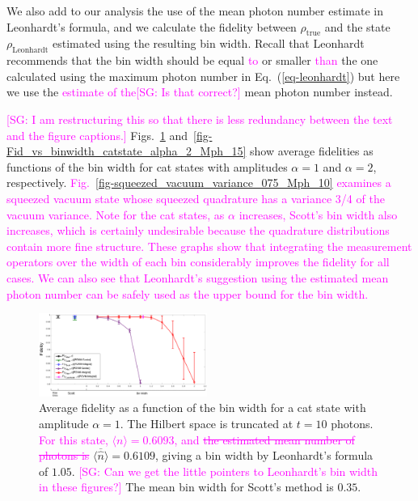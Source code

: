 \documentclass[
reprint,
superscriptaddress,
showpacs,
amsmath,
amssymb,
aps,
pra,
longbibliography
]{revtex4-1}
\providecommand{\aucmnt}[1]{#1}
\providecommand{\editcolor}[2]{\textcolor{#1}{#2}}
\providecommand{\aucmnt}[1]{}
\providecommand{\editcolor}[2]{#2}
\newcommand{\SG}[1]{\editcolor{magenta}{#1}}
\newcommand{\SGs}[1]{\aucmnt{\editcolor{magenta}{\sout{#1}}}}
\newcommand{\SGc}[1]{\aucmnt{\editcolor{magenta}{[SG: #1]}}}
\newcommand{\rhotrue}{\rho_{\text{true}}}
\begin{document}
We also add to our analysis the use of the mean photon number estimate
in Leonhardt's formula, and we calculate the fidelity between
$\rhotrue$ and the state $\rho_{\mathrm{Leonhardt}}$ estimated using
the resulting bin width. Recall that Leonhardt recommends that the bin
width should be equal \SG{to} or smaller \SG{than} the one calculated
using the maximum photon number in Eq.~(\ref{eq-leonhardt}) but here
we use the \SG{estimate of the}\SGc{Is that correct?} mean photon
number instead.

\SGc{I am restructuring this so that there is less redundancy between
  the text and the figure captions.}
Figs.~\ref{fig-Fidelity_vs_binwidth_catstate_Mph_10_alpha_1}
and~\ref{fig-Fid_vs_binwidth_catstate_alpha_2_Mph_15} show average
fidelities as functions of the bin width for cat states with
amplitudes $\alpha=1$ and $\alpha=2$,
respectively. \SG{Fig.~\ref{fig-squeezed_vacuum_variance_075_Mph_10}
  examines a squeezed vacuum state whose squeezed quadrature has a
  variance 3/4 of the vacuum variance.  Note for the cat states, as
  $\alpha$ increases, Scott's bin width also increases, which is
  certainly undesirable because the quadrature distributions contain
  more fine structure.  These graphs show that integrating the
  measurement operators over the width of each bin considerably
  improves the fidelity for all cases. We can also see that
  Leonhardt's suggestion using the estimated mean photon number can be
  safely used as the upper bound for the bin width.}

\begin{figure}
  \includegraphics[width=0.49\textwidth]{catstate-alpha=1-10photons.eps}
  \caption{Average fidelity as a function of the bin width for a cat
    state with amplitude $\alpha = 1$. The Hilbert space is truncated
    at $t=10$ photons. \SG{For this state,
      $\langle n \rangle = 0.6093$, and} \SGs{the estimated mean
      number of photons is}
    $\overline{\langle \hat{n} \rangle}=0.6109$, giving a bin width by
    Leonhardt's formula of $1.05$.  \SGc{Can we get the little
      pointers to Leonhardt's bin width in these figures?} The mean
    bin width for Scott's method is $0.35$.}
  \label{fig-Fidelity_vs_binwidth_catstate_Mph_10_alpha_1}
\end{figure}
\end{document}
